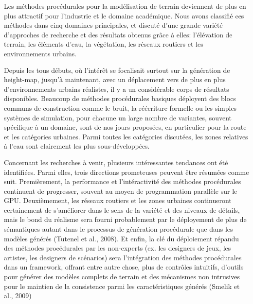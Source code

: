 \documentclass[11pt]{article}
\begin{document}
Les méthodes procédurales pour la modélisation de terrain deviennent de plus en plus attractif pour l'industrie et le domaine académique. Nous avons classifié ces méthodes dans cinq domaines principales, et discuté d'une grande variété d'approches de recherche et des résultats obtenus grâce à elles: l'élévation de terrain, les éléments d'eau, la végétation, les réseaux routiers et les environnements urbains. \newline

Depuis les tous débuts, où l'intérêt se focalisait surtout sur la génération de height-map, jusqu'à maintenant, avec un déplacement vers de plus en plus d'environnements urbains réalistes, il y a un considérable corps de résultats disponibles. Beaucoup de méthodes procédurales basiques déployent des blocs communs de construction comme le bruit, la réécriture formelle ou les simples systèmes de simulation, pour chacune un large nombre de variantes, souvent spécifique à un domaine, sont de nos jours proposées, en particulier pour la route et les catégories urbaines. Parmi toutes les catégories discutées, les zones relatives à l'eau sont clairement les plus sous-développées.\newline

Concernant les recherches à venir, plusieurs intéressantes tendances ont été identifiées. Parmi elles, trois directions prometeuses peuvent être résumées comme suit. Premièrement, la performance et l'intéractivité des méthodes procédurales continuent de progresser, souvent au moyen de programmation parallèle sur le GPU. Deuxièmement, les réseaux routiers et les zones urbaines continueront certainement de s'améliorer dans le sens de la variété et des niveaux de détails, mais le bond du réalisme sera fourni probablement par le déployement de plus de sémantiques autant dans le processus de génération procédurale que dans les modèles générés (Tutenel et al., 2008). Et enfin, la clé du déploiement répandu des méthodes procédurales par les non-experts (ex. les designers de jeux, les artistes, les designers de scénarios) sera l'intégration des méthodes procédurales dans un framework, offrant entre autre chose, plus de contrôles intuitifs, d'outils pour générer des modèles complets de terrain et des mécanismes non intrusives pour le maintien de la consistence parmi les caractéristiques générés  (Smelik et al., 2009)
\end{document}
